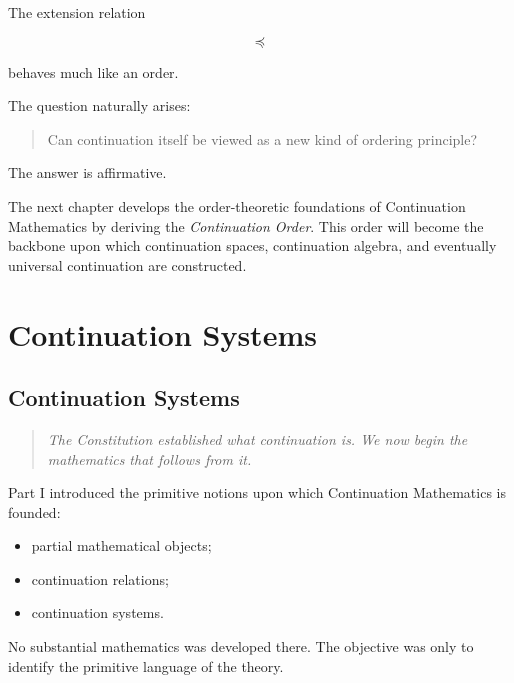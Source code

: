 \documentclass[13pt,openany]{book}
\theoremstyle{plain}
\theoremstyle{definition}
\begin{document}
The extension relation

\[
\preceq
\]

behaves much like an order.

The question naturally arises:

\begin{quote}
Can continuation itself be viewed as a new kind of ordering principle?
\end{quote}

The answer is affirmative.

The next chapter develops the order-theoretic foundations of Continuation
Mathematics by deriving the \emph{Continuation Order}. This order will
become the backbone upon which continuation spaces, continuation algebra,
and eventually universal continuation are constructed.

\part{Continuation Systems}

\chapter{Continuation Systems}

\begin{quote}
\emph{The Constitution established what continuation is. We now begin the
mathematics that follows from it.}
\end{quote}

\vspace{1em}

Part I introduced the primitive notions upon which Continuation
Mathematics is founded:

\begin{itemize}
\item partial mathematical objects;
\item continuation relations;
\item continuation systems.
\end{itemize}

No substantial mathematics was developed there. The objective was only to
identify the primitive language of the theory.
\end{document}
